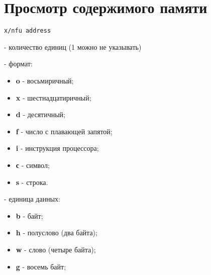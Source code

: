 \section{Просмотр содержимого памяти}

	\texttt{x/nfu address}

 - количество единиц (1 можно не указывать)

 - формат:
\begin{itemize}
	\setlength{\itemsep}{-1pt}
	\setlength{\parskip}{-1pt}
	\item {\bf o} - восьмиричный;
	\item {\bf x} - шестнадцатиричный;
	\item {\bf d} - десятичный;
	\item {\bf f} - число с плавающей запятой;
	\item {\bf i} - инструкция процессора;
	\item {\bf с} - символ;
	\item {\bf s} - строка.
\end{itemize}

 - единица данных:
\begin{itemize}
	\setlength{\itemsep}{-1pt}
	\setlength{\parskip}{-1pt}
	\item {\bf b} - байт;
	\item {\bf h} - полуслово (два байта);
	\item {\bf w} - слово (четыре байта);
	\item {\bf g} - восемь байт;
\end{itemize}
